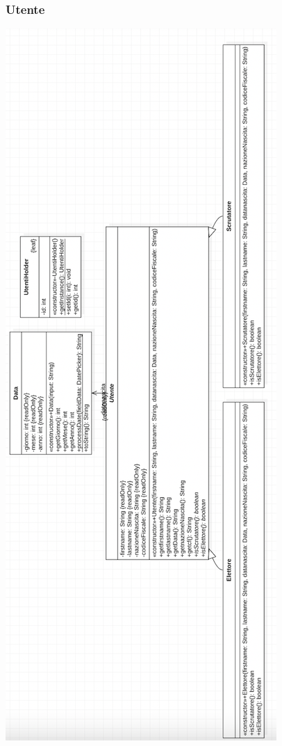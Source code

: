 \documentclass[11pt, oneside]{article}   	%
\begin{document}
\subsubsection{Utente}
\begin{center}
\includegraphics[scale=0.7]{images/class12.png}
\end{center}
\end{document}
